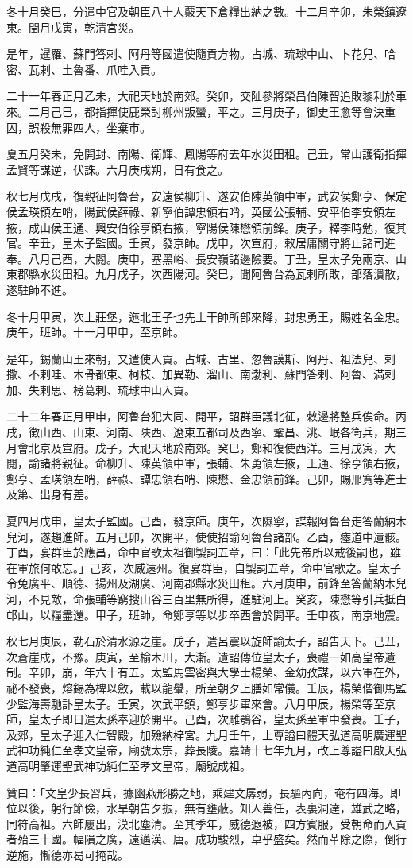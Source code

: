 \begin{pinyinscope}
冬十月癸巳，分遣中官及朝臣八十人覈天下倉糧出納之數。十二月辛卯，朱榮鎮遼東。閏月戊寅，乾清宮災。

是年，暹羅、蘇門答剌、阿丹等國遣使隨貢方物。占城、琉球中山、卜花兒、哈密、瓦剌、土魯番、爪哇入貢。

二十一年春正月乙未，大祀天地於南郊。癸卯，交阯參將榮昌伯陳智追敗黎利於車來。二月己巳，都指揮使鹿榮討柳州叛蠻，平之。三月庚子，御史王愈等會決重囚，誤殺無罪四人，坐棄市。

夏五月癸未，免開封、南陽、衛輝、鳳陽等府去年水災田租。己丑，常山護衛指揮孟賢等謀逆，伏誅。六月庚戌朔，日有食之。

秋七月戊戌，復親征阿魯台，安遠侯柳升、遂安伯陳英領中軍，武安侯鄭亨、保定侯孟瑛領左哨，陽武侯薛祿、新寧伯譚忠領右哨，英國公張輔、安平伯李安領左掖，成山侯王通、興安伯徐亨領右掖，寧陽侯陳懋領前鋒。庚子，釋李時勉，復其官。辛丑，皇太子監國。壬寅，發京師。戊申，次宣府，敕居庸關守將止諸司進奉。八月己酉，大閱。庚申，塞黑峪、長安嶺諸邊險要。丁丑，皇太子免兩京、山東郡縣水災田租。九月戊子，次西陽河。癸巳，聞阿魯台為瓦剌所敗，部落潰散，遂駐師不進。

冬十月甲寅，次上莊堡，迤北王子也先土干帥所部來降，封忠勇王，賜姓名金忠。庚午，班師。十一月甲申，至京師。

是年，錫蘭山王來朝，又遣使入貢。占城、古里、忽魯謨斯、阿丹、祖法兒、剌撒、不剌哇、木骨都束、柯枝、加異勒、溜山、南渤利、蘇門答剌、阿魯、滿剌加、失剌思、榜葛剌、琉球中山入貢。

二十二年春正月甲申，阿魯台犯大同、開平，詔群臣議北征，敕邊將整兵俟命。丙戌，徵山西、山東、河南、陜西、遼東五都司及西寧、鞏昌、洮、岷各衛兵，期三月會北京及宣府。戊子，大祀天地於南郊。癸巳，鄭和復使西洋。三月戊寅，大閱，諭諸將親征。命柳升、陳英領中軍，張輔、朱勇領左掖，王通、徐亨領右掖，鄭亨、孟瑛領左哨，薛祿、譚忠領右哨、陳懋、金忠領前鋒。己卯，賜邢寬等進士及第、出身有差。

夏四月戊申，皇太子監國。己酉，發京師。庚午，次隰寧，諜報阿魯台走答蘭納木兒河，遂趨進師。五月己卯，次開平，使使招諭阿魯台諸部。乙酉，瘞道中遺骸。丁酉，宴群臣於應昌，命中官歌太祖御製詞五章，曰：「此先帝所以戒後嗣也，雖在軍旅何敢忘。」己亥，次威遠州。復宴群臣，自製詞五章，命中官歌之。皇太子令兔廣平、順德、揚州及湖廣、河南郡縣水災田租。六月庚申，前鋒至答蘭納木兒河，不見敵，命張輔等窮搜山谷三百里無所得，進駐河上。癸亥，陳懋等引兵抵白邙山，以糧盡還。甲子，班師，命鄭亨等以步卒西會於開平。壬申夜，南京地震。

秋七月庚辰，勒石於清水源之崖。戊子，遣呂震以旋師諭太子，詔告天下。己丑，次蒼崖戍，不豫。庚寅，至榆木川，大漸。遺詔傳位皇太子，喪禮一如高皇帝遺制。辛卯，崩，年六十有五。太監馬雲密與大學士楊榮、金幼孜謀，以六軍在外，祕不發喪，熔錫為椑以斂，載以龍轝，所至朝夕上膳如常儀。壬辰，楊榮偕御馬監少監海壽馳訃皇太子。壬寅，次武平鎮，鄭亨步軍來會。八月甲辰，楊榮等至京師，皇太子即日遣太孫奉迎於開平。己酉，次雕鶚谷，皇太孫至軍中發喪。壬子，及郊，皇太子迎入仁智殿，加殮納梓宮。九月壬午，上尊謚曰體天弘道高明廣運聖武神功純仁至孝文皇帝，廟號太宗，葬長陵。嘉靖十七年九月，改上尊謚曰啟天弘道高明肇運聖武神功純仁至孝文皇帝，廟號成祖。

贊曰：「文皇少長習兵，據幽燕形勝之地，乘建文孱弱，長驅內向，奄有四海。即位以後，躬行節儉，水旱朝告夕振，無有壅蔽。知人善任，表裏洞達，雄武之略，同符高祖。六師屢出，漠北塵清。至其季年，威德遐被，四方賓服，受朝命而入貢者殆三十國。幅隕之廣，遠邁漢、唐。成功駿烈，卓乎盛矣。然而革除之際，倒行逆施，慚德亦曷可掩哉。

\end{pinyinscope}